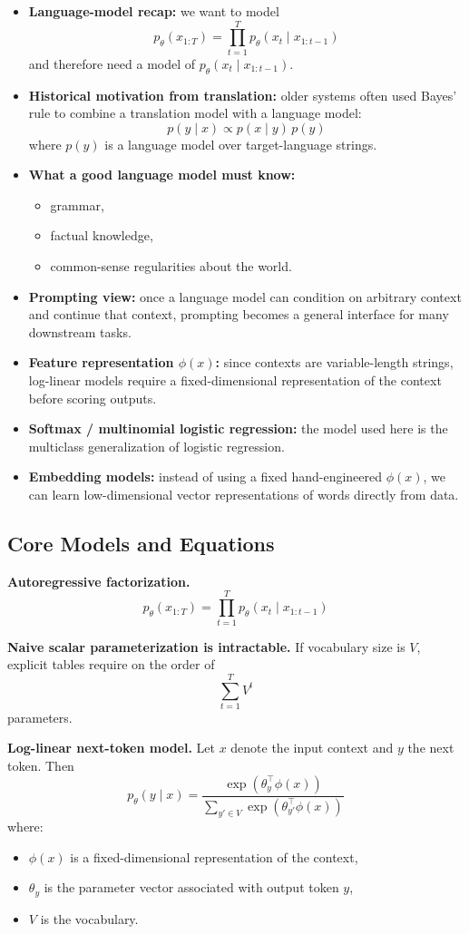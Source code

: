 \documentclass[11pt]{article}
\begin{document}
\begin{itemize}
    \item \textbf{Language-model recap:} we want to model
    \[
    p_\theta(x_{1:T}) = \prod_{t=1}^{T} p_\theta(x_t \mid x_{1:t-1})
    \]
    and therefore need a model of \(p_\theta(x_t \mid x_{1:t-1})\).
    \item \textbf{Historical motivation from translation:} older systems often used Bayes' rule to combine a translation model with a language model:
    \[
    p(y \mid x) \propto p(x \mid y)\, p(y)
    \]
    where \(p(y)\) is a language model over target-language strings.
    \item \textbf{What a good language model must know:}
    \begin{itemize}
        \item grammar,
        \item factual knowledge,
        \item common-sense regularities about the world.
    \end{itemize}
    \item \textbf{Prompting view:} once a language model can condition on arbitrary context and continue that context, prompting becomes a general interface for many downstream tasks.
    \item \textbf{Feature representation \(\phi(x)\):} since contexts are variable-length strings, log-linear models require a fixed-dimensional representation of the context before scoring outputs.
    \item \textbf{Softmax / multinomial logistic regression:} the model used here is the multiclass generalization of logistic regression.
    \item \textbf{Embedding models:} instead of using a fixed hand-engineered \(\phi(x)\), we can learn low-dimensional vector representations of words directly from data.
\end{itemize}

\subsection{Core Models and Equations}
\textbf{Autoregressive factorization.}
\[
p_\theta(x_{1:T}) = \prod_{t=1}^{T} p_\theta(x_t \mid x_{1:t-1})
\]

\textbf{Naive scalar parameterization is intractable.} If vocabulary size is \(V\), explicit tables require on the order of
\[
\sum_{t=1}^{T} V^t
\]
parameters.

\textbf{Log-linear next-token model.} Let \(x\) denote the input context and \(y\) the next token. Then
\[
p_\theta(y \mid x) = \frac{\exp\!\left(\theta_y^\top \phi(x)\right)}
{\sum_{y' \in V} \exp\!\left(\theta_{y'}^\top \phi(x)\right)}
\]
where:
\begin{itemize}
    \item \(\phi(x)\) is a fixed-dimensional representation of the context,
    \item \(\theta_y\) is the parameter vector associated with output token \(y\),
    \item \(V\) is the vocabulary.
\end{itemize}
\end{document}
